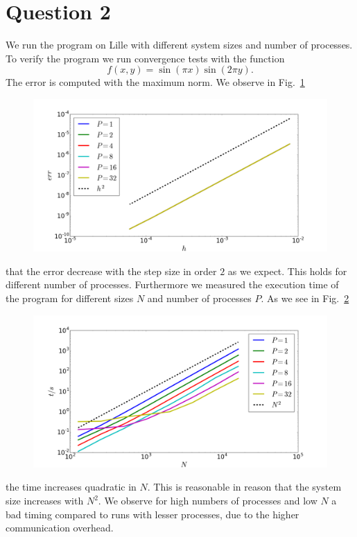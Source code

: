 \section*{Question 2}

We run the program on Lille with different system sizes and number of processes. To verify the program we run convergence tests with the function 
\begin{equation}
	f(x,y) = \sin(\pi x)\sin(2 \pi y).
\end{equation}
The error is computed with the maximum norm. We observe in Fig.~\ref{fig:size_err}\begin{figure}[h] 
  \centering
     \includegraphics[width=\textwidth]{pic/size_err.png}
  \caption{}
  \label{fig:size_err}
\end{figure} that the error decrease with the step size in order $2$ as we expect. This holds for different number of processes. Furthermore we measured the execution time of the program for different sizes $N$ and number of processes $P$. As we see in Fig.~\ref{fig:size_time}\begin{figure}[h] 
  \centering
     \includegraphics[width=\textwidth]{pic/size_time.png}
  \caption{}
  \label{fig:size_time}
\end{figure} the time increases quadratic in $N$. This is reasonable in reason that the system size increases with $N^2$. We observe for high numbers of processes and low $N$ a bad timing compared to runs with lesser processes, due to the higher communication overhead. 


